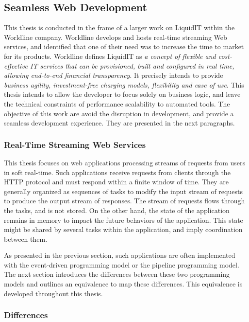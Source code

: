 \subsection{Seamless Web Development}

This thesis is conducted in the frame of a larger work on LiquidIT within the Worldline company.
Worldline develops and hosts real-time streaming Web services, and identified that one of their need was to increase the time to market for its products.
Worldline defines LiquidIT as \textit{a concept of flexible and cost-effective IT services that can be provisioned, built and configured in real time, allowing end-to-end financial transparency}.
It precisely intends to provide \textit{business agility, investment-free charging models, flexibility and ease of use}.
This thesis intends to allow the developer to focus solely on business logic, and leave the technical constraints of performance scalability to automated tools.
The objective of this work are avoid the disruption in development, and provide a seamless development experience.
They are presented in the next paragraphs.

\subsubsection{Real-Time Streaming Web Services}

This thesis focuses on web applications processing streams of requests from users in soft real-time.
Such applications receive requests from clients through the HTTP protocol and must respond within a finite window of time.
They are generally organized as sequences of tasks to modify the input stream of requests to produce the output stream of responses.
The stream of requests flows through the tasks, and is not stored.
On the other hand, the state of the application remains in memory to impact the future behaviors of the application.
This state might be shared by several tasks within the application, and imply coordination between them.

As presented in the previous section, such applications are often implemented with the event-driven programming model or the pipeline programming model.
The next section introduces the differences between these two programming models and outlines an equivalence to map these differences.
This equivalence is developed throughout this thesis.

\subsubsection{Differences}

